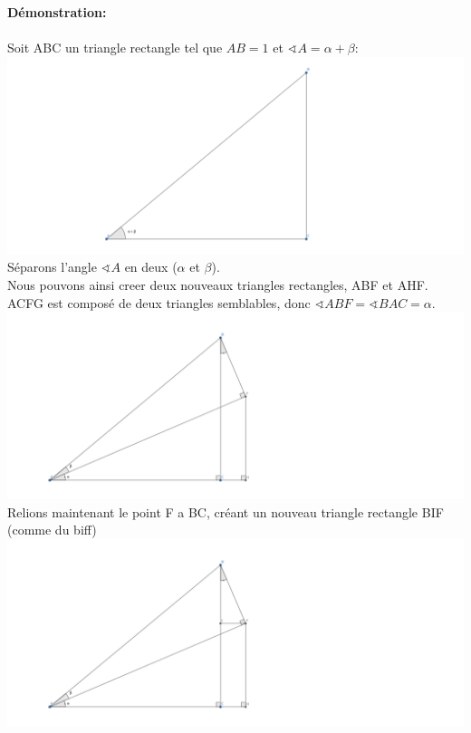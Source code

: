 \documentclass[12pt]{article}
\begin{document}
\textbf{Démonstration:}\\
\\
Soit ABC un triangle rectangle tel que $AB = 1$ et $\sphericalangle A = \alpha+\beta$:\\
\includegraphics{trigo_sum_proof/initial.png}\\
Séparons l'angle $\sphericalangle A$ en deux ($\alpha$ et $\beta$).\\
Nous pouvons ainsi creer deux nouveaux triangles rectangles, ABF et AHF.\\
ACFG est composé de deux triangles semblables, donc $\sphericalangle ABF = \sphericalangle BAC = \alpha$.\\
\includegraphics{trigo_sum_proof/mid.png}\\
Relions maintenant le point F a BC, créant un nouveau triangle rectangle BIF (comme du biff)\\
\includegraphics{trigo_sum_proof/last.png}\\
\end{document}
